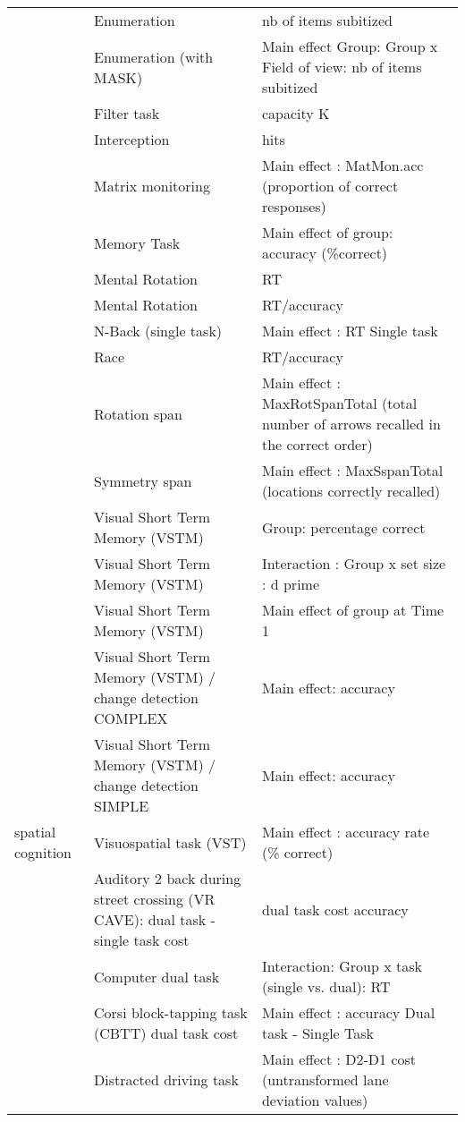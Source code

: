 \documentclass[
]{book}
\begin{document}
\begin{tabular}{l|l|l}
\cline{2-3}
 & Enumeration & nb of items subitized\\
\cline{2-3}
 & Enumeration (with MASK) & Main effect Group: Group x Field of view: nb of items subitized\\
\cline{2-3}
 & Filter task & capacity K\\
\cline{2-3}
 & Interception & hits\\
\cline{2-3}
 & Matrix monitoring & Main effect : MatMon.acc (proportion of correct responses)\\
\cline{2-3}
 & Memory Task & Main effect of group: accuracy (\%correct)\\
\cline{2-3}
 & Mental Rotation & RT\\
\cline{2-3}
 & Mental Rotation & RT/accuracy\\
\cline{2-3}
 & N-Back (single task) & Main effect : RT Single task\\
\cline{2-3}
 & Race & RT/accuracy\\
\cline{2-3}
 & Rotation span & Main effect : MaxRotSpanTotal (total number of arrows recalled in the correct order)\\
\cline{2-3}
 & Symmetry span & Main effect : MaxSspanTotal (locations correctly recalled)\\
\cline{2-3}
 & Visual Short Term Memory (VSTM) & Group: percentage correct\\
\cline{2-3}
 & Visual Short Term Memory (VSTM) & Interaction : Group x set size : d prime\\
\cline{2-3}
 & Visual Short Term Memory (VSTM) & Main effect of group at Time 1\\
\cline{2-3}
 & Visual Short Term Memory (VSTM) / change detection COMPLEX & Main effect: accuracy\\
\cline{2-3}
 & Visual Short Term Memory (VSTM) / change detection SIMPLE & Main effect: accuracy\\
\cline{2-3}
\multirow[t]{-28}{*}{\raggedright\arraybackslash spatial cognition} & Visuospatial task (VST) & Main effect : accuracy rate (\% correct)\\
\cline{1-3}
 & Auditory 2 back during street crossing (VR CAVE):  dual task - single task cost & dual task cost accuracy\\
\cline{2-3}
 & Computer dual task & Interaction: Group x task (single vs. dual): RT\\
\cline{2-3}
 & Corsi block-tapping task (CBTT) dual task cost & Main effect : accuracy Dual task - Single Task\\
\cline{2-3}
 & Distracted driving task & Main effect : D2-D1 cost (untransformed lane deviation values)\\

\end{tabular}
\end{document}
